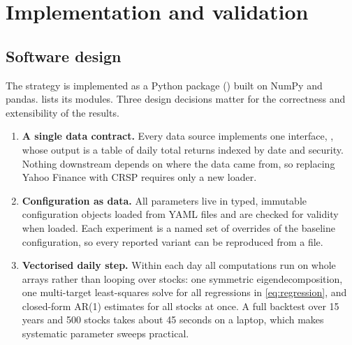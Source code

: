 \section{Implementation and validation}
\label{sec:impl}

\subsection{Software design}

The strategy is implemented as a Python package () built on NumPy and
pandas.  lists its modules. Three design decisions matter for the
correctness and extensibility of the results.

\begin{enumerate}
  \item \textbf{A single data contract.} Every data source implements one interface,
        , whose output is a table of daily total returns indexed by date and
        security. Nothing downstream depends on where the data came from, so replacing Yahoo
        Finance with CRSP requires only a new loader.
  \item \textbf{Configuration as data.} All parameters live in typed, immutable configuration
        objects loaded from YAML files and are checked for validity when loaded. Each experiment
        is a named set of overrides of the baseline configuration, so every reported variant can
        be reproduced from a file.
  \item \textbf{Vectorised daily step.} Within each day all computations run on whole arrays
        rather than looping over stocks: one symmetric eigendecomposition, one multi-target
        least-squares solve for all regressions in \cref{eq:regression}, and closed-form AR(1)
        estimates for all stocks at once. A full backtest over 15 years and 500 stocks takes
        about 45 seconds on a laptop, which makes systematic parameter sweeps practical.
\end{enumerate}

